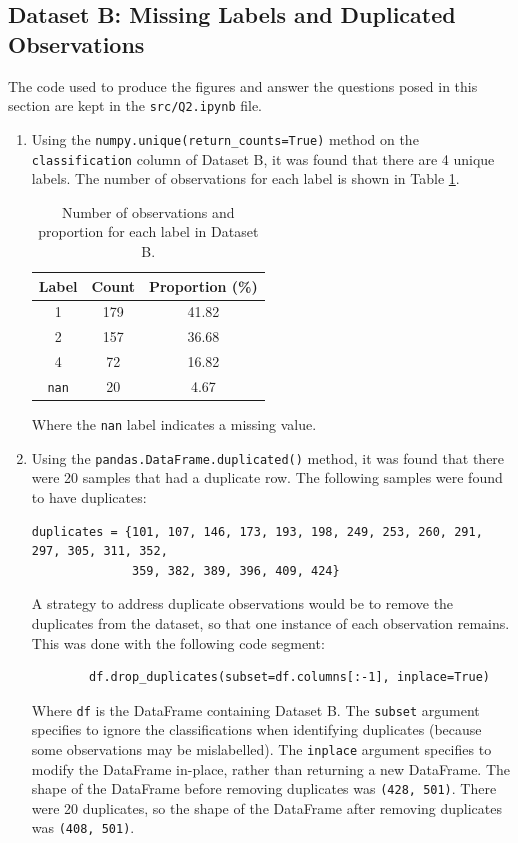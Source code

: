 \documentclass{article}
\begin{document}
\subsection{Dataset B: Missing Labels and Duplicated Observations}
The code used to produce the figures and answer the questions posed in this section are kept in the \verb|src/Q2.ipynb| file.
\begin{enumerate}[label=\alph*)]
    \item Using the \verb|numpy.unique(return_counts=True)| method on the \verb|classification| column of Dataset B, it was found that there are 4 unique labels. The number of observations for each label is shown in Table \ref{tab:Q2a_label_counts}.
    \begin{table}[!htb]
        \centering
        \begin{tabular}{|c|c|c|}\hline
            \textbf{Label} & \textbf{Count} & \textbf{Proportion (\%)} \\ \hline
            1 & 179 & 41.82 \\ \hline
            2 & 157 & 36.68 \\ \hline
            4 & 72 & 16.82 \\ \hline
            \verb|nan| & 20 & 4.67 \\ \hline
        \end{tabular}
        \caption{Number of observations and proportion for each label in Dataset B.}
        \label{tab:Q2a_label_counts}
    \end{table}
    Where the \verb|nan| label indicates a missing value.

    \item Using the \verb|pandas.DataFrame.duplicated()| method, it was found that there were 20 samples that had a duplicate row. The following samples were found to have duplicates:
    \begin{verbatim}
duplicates = {101, 107, 146, 173, 193, 198, 249, 253, 260, 291, 297, 305, 311, 352, 
              359, 382, 389, 396, 409, 424}
    \end{verbatim}
    A strategy to address duplicate observations would be to remove the duplicates from the dataset, so that one instance of each observation remains. This was done with the following code segment:
    \begin{verbatim}
        df.drop_duplicates(subset=df.columns[:-1], inplace=True)
    \end{verbatim}
    Where \verb|df| is the DataFrame containing Dataset B. The \verb|subset| argument specifies to ignore the classifications when identifying duplicates (because some observations may be mislabelled). The \verb|inplace| argument specifies to modify the DataFrame in-place, rather than returning a new DataFrame. The shape of the DataFrame before removing duplicates was \verb|(428, 501)|. There were 20 duplicates, so the shape of the DataFrame after removing duplicates was \verb|(408, 501)|.


\end{enumerate}
\end{document}
